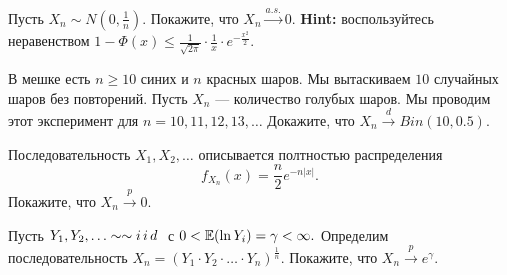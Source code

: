 \documentclass[12pt, a4paper, oneside]{article}
\begin{document}



\begin{problem}{}
Пусть $X_n \sim N(0, \frac{1}{n}).$ Покажите, что  $X_n \overset{a.s.}{\to} 0$. \textbf{Hint:} воспользуйтесь неравенством $1 - \Phi(x) \le \frac{1}{\sqrt{2\pi}}\cdot\frac{1}{x}\cdot e^{-\frac{x^2}{2}}$.
\end{problem} 


\begin{problem}{}
В мешке есть $n \ge 10$ синих и $n$ красных шаров. Мы вытаскиваем $10$ случайных шаров без повторений. Пусть $X_n$ --- количество голубых шаров. Мы проводим этот эксперимент для $n=10,11,12,13,\ldots$ Докажите, что $X_n \overset{d}{\to} Bin(10, 0.5)$.
\end{problem} 


\begin{problem}{}
Последовательность $X_1, X_2, \ldots$ описывается полтностью распределения \[f_{X_n}(x) = \frac{n}{2}e^{-n|x|}.\] Покажите, что $X_n \overset{p}{\to} 0.$
\end{problem} 


\begin{problem}{}
Пусть $Y_1, Y_2, \ldots \sim \sim i\,i\,d\,\,$ с $0 < \mathbb{E}(\ln Y_i) = \gamma < \infty.$ Определим последовательность $X_n = (Y_1 \cdot Y_2 \cdot \ldots \cdot Y_n)^{\frac{1}{n}}.$ Покажите, что $X_n \overset{p}{\to} e^{\gamma}.$
\end{problem} 
\end{document}
